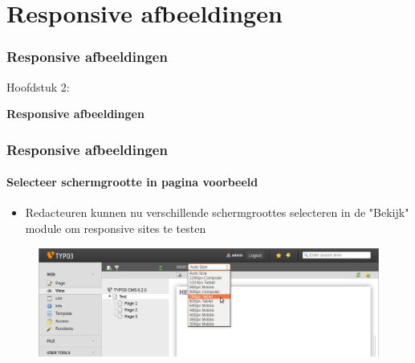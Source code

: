 %

\section{Responsive afbeeldingen}
\begin{frame}[fragile]
	\frametitle{Responsive afbeeldingen}

	\begin{center}\huge{Hoofdstuk 2:}\end{center}
	\begin{center}\huge{\color{typo3darkgrey}\textbf{Responsive afbeeldingen}}\end{center}

\end{frame}


\begin{frame}[fragile]
	\frametitle{Responsive afbeeldingen}
	\framesubtitle{Selecteer schermgrootte in pagina voorbeeld}

	\begin{itemize}
		\item Redacteuren kunnen nu verschillende schermgroottes selecteren in de "Bekijk" module om responsive sites te testen
	\end{itemize}

	\begin{figure}
		\includegraphics[width=0.95\linewidth]{Images/ResponsiveImages/ScreenSizeInPagePreview.png}
	\end{figure}

\end{frame}

